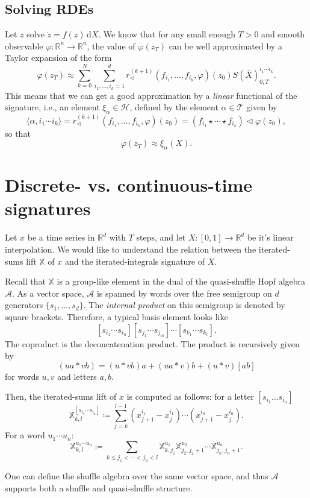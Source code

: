 \documentclass[10pt, reqno]{article}
\theoremstyle{definition}
\theoremstyle{plain}
\newcommand{\A}{\mathcal{A}}
\newcommand{\R}{\mathbb{R}}
\newcommand{\T}{\mathscr{T}}
\newcommand{\bbX}{\mathbb{X}}
\renewcommand{\H}{\mathscr{H}}
\begin{document}
\subsection{Solving RDEs}
Let \(z\) solve \(\dot z=f(z)\,\mathrm dX\).
We know that for any small enough \(T>0\) and smooth observable \(\varphi\colon\R^n\to\R^n\), the value of \(\varphi(z_T)\) can be
well approximated by a Taylor expansion of the form
\[
	\varphi(z_T)\approx\sum_{k=0}^N\sum_{i_1,\dotsc,i_k=1}^dr^{(k+1)}_\triangleleft(f_{i_1},\dotsc,f_{i_k},\varphi)(z_0)S(\bar X)^{i_1\dotsm i_k}_{0,T}.
\]
This means that we can get a good approximation by a \emph{linear} functional of the signature, i.e., an element
\(\xi_\alpha\in\H\), defined by the element \(\alpha\in\T\) given by
\[
	\langle \alpha,i_1\dotsm i_k\rangle=r^{(k+1)}_\triangleleft(f_{i_1},\dotsc,f_{i_k},\varphi)(z_0)=(f_{i_1}\star\dotsm\star f_{i_k})\triangleleft\varphi(z_0),
\]
so that
\[
	\varphi(z_T)\approx\xi_\alpha(X).
\]
\clearpage
\section{Discrete- vs. continuous-time signatures}
Let \(x\) be a time series in \(\R^d\) with \(T\) steps, and let \(X\colon[0,1]\to\R^d\) be it's linear interpolation.
We would like to understand the relation between the iterated-sums lift \(\bbX\) of \(x\) and the iterated-integrals
signature of \(X\).

Recall that \(\bbX\) is a group-like element in the dual of the quasi-shuffle Hopf algebra \(\A\).
As a vector space, \(\A\) is spanned by words over the free semigroup on \(d\) generators \(\{s_1,\dotsc,s_d\}\).
The \emph{internal product} on this semigroup is denoted by square brackets.
Therefore, a typical basis element looks like
\[
	[s_{i_1}\dotsm s_{i_n}][s_{j_1}\dotsm s_{j_m}]\dotsm[s_{k_1}\dotsm s_{k_\ell}].
\]
The coproduct is the deconcatenation product. The product is recursively given by
\[
	(ua*vb)=(u*vb)a+(ua*v)b+(u*v)[ab]
\]
for words \(u,v\) and letters \(a,b\).

Then, the iterated-sums lift of \(x\) is computed as follows: for a letter \([s_{i_1}\dots s_{i_n}]\)
\[
	\bbX^{[s_{i_1}\dotsm s_{i_n}]}_{k,l}\coloneqq\sum_{j=k}^{l-1}(x^{i_1}_{j+1}-x^{i_1}_j)\dotsm(x^{i_n}_{j+1}-x^{i_n}_j).
\]
For a word \(u_1\dotsm u_n\):
\[
	\bbX^{u_1\dotsm u_n}_{k,l}\coloneqq\sum_{k\le j_1<\dotsb<j_n<l}\bbX^{u_1}_{k,j_1}\bbX^{u_2}_{j_2,j_2+1}\dotsm\bbX^{u_n}_{j_n,j_n+1}.
\]

One can define the shuffle algebra over the same vector space, and thus \(\A\) supports both a shuffle and quasi-shuffle
structure. 
\end{document}
